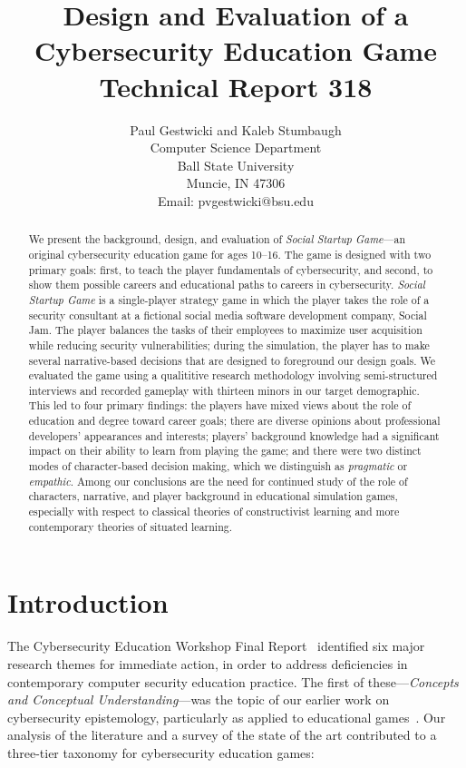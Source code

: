 \documentclass[letterpaper]{article}
\title{Design and Evaluation of a Cybersecurity Education Game\\
\medskip
\serc{} Technical Report 318\\
}
\author{Paul Gestwicki and Kaleb Stumbaugh\\
Computer Science Department\\
Ball State University\\
Muncie, IN 47306\\
Email: pvgestwicki@bsu.edu}
\begin{document}
\maketitle


\begin{abstract}
We present the background, design, and evaluation of 
\textit{Social Startup Game}---an original cybersecurity education
game for ages 10--16.
The game is designed with two primary goals: first, to teach the player
fundamentals of cybersecurity, and second, to show them possible
careers and educational paths to careers in cybersecurity.
\textit{Social Startup Game} is a single-player strategy game in
which the player takes the role of a security consultant at a fictional
social media software development company, Social Jam.
The player balances the tasks of their employees to maximize user
acquisition while reducing security vulnerabilities; during the simulation,
the player has to make several narrative-based decisions that are designed
to foreground our design goals.
We evaluated the game using a qualititive research methodology
involving semi-structured interviews and recorded gameplay with
thirteen minors in our target demographic.
This led to four primary findings:
the players have mixed views about the role of education and degree
toward career goals;
there are diverse opinions about professional 
developers' appearances and interests;
players' background knowledge had a significant impact on their
ability to learn from playing the game;
and
there were two distinct modes of character-based decision making,
which we distinguish as \textit{pragmatic} or \textit{empathic}.
Among our conclusions are the need for continued study of the
role of characters, narrative, and player background in educational
simulation games, especially with respect to classical theories
of constructivist learning and more contemporary theories of situated learning.

\end{abstract}

\section{Introduction}

The Cybersecurity Education Workshop Final
Report~\cite{Cybersecurity2014} identified six major research themes
for immediate action, in order to address deficiencies in contemporary
computer security education practice. The first of these---\textit{Concepts and Conceptual Understanding}---was the topic of our earlier work
on cybersecurity epistemology, particularly as applied to
educational games~\citep{Gestwicki2015,Gestwicki2015-tr}.
Our analysis of the literature and a survey of the state of the art
contributed to a three-tier taxonomy for cybersecurity education games:
\end{document}
